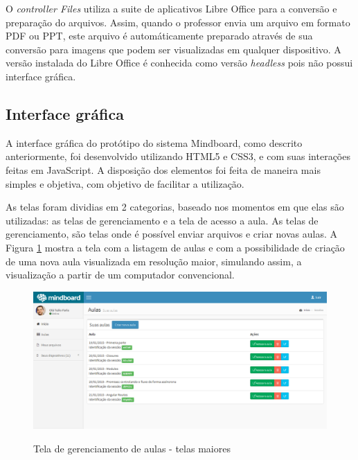 

O \emph{controller Files} utiliza a suite de aplicativos Libre Office para a conversão e preparação do arquivos. Assim, quando o professor envia um arquivo em formato PDF ou PPT, este arquivo é automáticamente preparado através de sua conversão para imagens que podem ser visualizadas em qualquer dispositivo. A versão instalada do Libre Office é conhecida como versão \emph{headless} pois não possui interface gráfica.

\subsection{Interface gráfica}
\label{sec:interface_grafica}

A interface gráfica do protótipo do sistema Mindboard, como descrito anteriormente, foi desenvolvido utilizando HTML5 e CSS3, e com suas interações feitas em JavaScript. A disposição dos elementos foi feita de maneira mais simples e objetiva, com objetivo de facilitar a utilização.

As telas foram dividias em 2 categorias, baseado nos momentos em que elas são utilizadas: as telas de gerenciamento e a tela de acesso a aula. As telas de gerenciamento, são telas onde é possível enviar arquivos e criar novas aulas. A Figura \ref{fig:tela_aulas} mostra a tela com a listagem de aulas e com a possibilidade de criação de uma nova aula visualizada em resolução maior, simulando assim, a visualização a partir de um computador convencional.

\begin{figure}[h]
\centering
\caption{Tela de gerenciamento de aulas - telas maiores}
\includegraphics[width=1.0\textwidth]{imgs/tela_aulas.png} 
\label{fig:tela_aulas} 
\end{figure}

